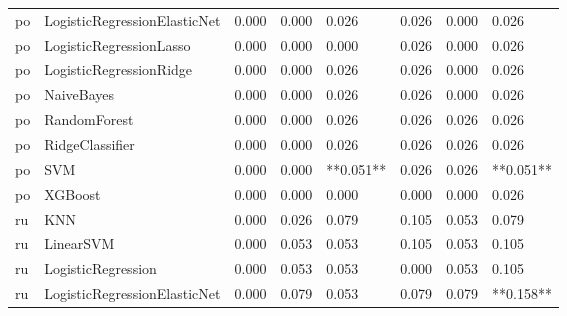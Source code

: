 \begin{tabular}{llllllll}
      po & LogisticRegressionElasticNet & 0.000 &                     0.000 &                 0.026 &                  0.026 &                                   0.000 &     0.026 \\
      po &      LogisticRegressionLasso & 0.000 &                     0.000 &                 0.000 &                  0.026 &                                   0.000 &     0.026 \\
      po &      LogisticRegressionRidge & 0.000 &                     0.000 &                 0.026 &                  0.026 &                                   0.000 &     0.026 \\
      po &                   NaiveBayes & 0.000 &                     0.000 &                 0.026 &                  0.026 &                                   0.000 &     0.026 \\
      po &                 RandomForest & 0.000 &                     0.000 &                 0.026 &                  0.026 &                                   0.026 &     0.026 \\
      po &              RidgeClassifier & 0.000 &                     0.000 &                 0.026 &                  0.026 &                                   0.026 &     0.026 \\
      po &                          SVM & 0.000 &                     0.000 &             **0.051** &                  0.026 &                                   0.026 & **0.051** \\
      po &                      XGBoost & 0.000 &                     0.000 &                 0.000 &                  0.000 &                                   0.000 &     0.026 \\
      ru &                          KNN & 0.000 &                     0.026 &                 0.079 &                  0.105 &                                   0.053 &     0.079 \\
      ru &                    LinearSVM & 0.000 &                     0.053 &                 0.053 &                  0.105 &                                   0.053 &     0.105 \\
      ru &           LogisticRegression & 0.000 &                     0.053 &                 0.053 &                  0.000 &                                   0.053 &     0.105 \\
      ru & LogisticRegressionElasticNet & 0.000 &                     0.079 &                 0.053 &                  0.079 &                                   0.079 & **0.158** \\

\end{tabular}
